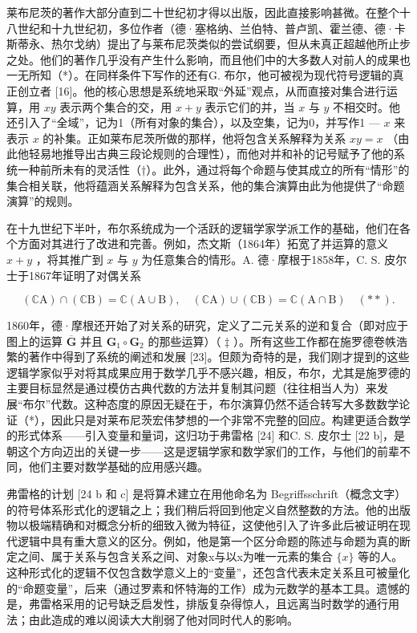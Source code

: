莱布尼茨的著作大部分直到二十世纪初才得以出版，因此直接影响甚微。在整个十八世纪和十九世纪初，多位作者（德·塞格纳、兰伯特、普卢凯、霍兰德、德·卡斯蒂永、热尔戈纳）提出了与莱布尼茨类似的尝试纲要，但从未真正超越他所止步之处。他们的著作几乎没有产生什么影响，而且他们中的大多数人对前人的成果也一无所知（*）。在同样条件下写作的还有G. 布尔，他可被视为现代符号逻辑的真正创立者 {[}16{]}。他的核心思想是系统地采取“外延”观点，从而直接对集合进行运算，用 \(xy\) 表示两个集合的交，用 \(x + y\) 表示它们的并，当 \(x\) 与 \(y\) 不相交时。他还引入了“全域”，记为1（所有对象的集合），以及空集，记为0，并写作1 — \(x\) 来表示 \(x\) 的补集。正如莱布尼茨所做的那样，他将包含关系解释为关系 \(xy = x\) （由此他轻易地推导出古典三段论规则的合理性），而他对并和补的记号赋予了他的系统一种前所未有的灵活性（†）。此外，通过将每个命题与使其成立的所有“情形”的集合相关联，他将蕴涵关系解释为包含关系，他的集合演算由此为他提供了“命题演算”的规则。

在十九世纪下半叶，布尔系统成为一个活跃的逻辑学家学派工作的基础，他们在各个方面对其进行了改进和完善。例如，杰文斯（1864年）拓宽了并运算的意义 \(x + y\) ，将其推广到 \(x\) 与 \(y\) 为任意集合的情形。A. 德·摩根于1858年，C. S. 皮尔士于1867年证明了对偶关系

\[
\left(\mathbb {C} \mathrm{A}\right) \cap \left(\mathbb {C} \mathrm{B}\right) = \mathbb {C} (\mathrm{A} \cup \mathrm{B}), \quad \left(\mathbb {C} \mathrm{A}\right) \cup \left(\mathbb {C} \mathrm{B}\right) = \mathbb {C} (\mathrm{A} \cap \mathrm{B}) \quad (* *).
\]

1860年，德·摩根还开始了对关系的研究，定义了二元关系的逆和复合（即对应于图上的运算 \(\overline{\mathbf{G}}\) 并且 \(\mathbf{G}_1 \circ \mathbf{G}_2\) 的那些运算）（ \(\ddagger\) ）。所有这些工作都在施罗德卷帙浩繁的著作中得到了系统的阐述和发展 {[}23{]}。但颇为奇特的是，我们刚才提到的这些逻辑学家似乎对将其成果应用于数学几乎不感兴趣，相反，布尔，尤其是施罗德的主要目标显然是通过模仿古典代数的方法并复制其问题（往往相当人为）来发展“布尔”代数。这种态度的原因无疑在于，布尔演算仍然不适合转写大多数数学论证（*），因此只是对莱布尼茨宏伟梦想的一个非常不完整的回应。构建更适合数学的形式体系——引入变量和量词，这归功于弗雷格 {[}24{]} 和C. S. 皮尔士 {[}22 b{]}，是朝这个方向迈出的关键一步——这是逻辑学家和数学家们的工作，与他们的前辈不同，他们主要对数学基础的应用感兴趣。

弗雷格的计划 {[}24 b 和 c{]} 是将算术建立在用他命名为 Begriffsschrift（概念文字）的符号体系形式化的逻辑之上；我们稍后将回到他定义自然整数的方法。他的出版物以极端精确和对概念分析的细致入微为特征，这使他引入了许多此后被证明在现代逻辑中具有重大意义的区分。例如，他是第一个区分命题的陈述与命题为真的断定之间、属于关系与包含关系之间、对象x与以x为唯一元素的集合 \(\{x\}\) 等的人。这种形式化的逻辑不仅包含数学意义上的“变量”，还包含代表未定关系且可被量化的“命题变量”，后来（通过罗素和怀特海的工作）成为元数学的基本工具。遗憾的是，弗雷格采用的记号缺乏启发性，排版复杂得惊人，且远离当时数学的通行用法；由此造成的难以阅读大大削弱了他对同时代人的影响。

